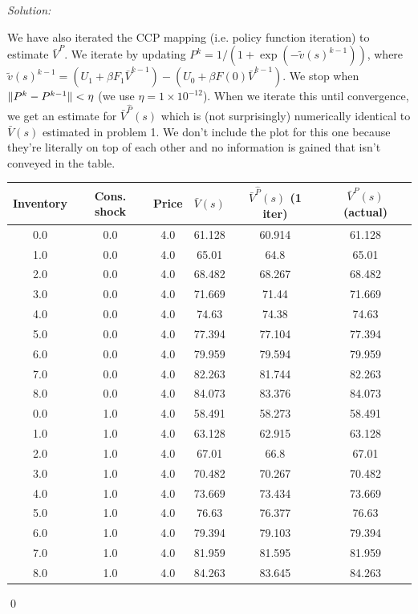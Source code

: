 \documentclass[12pt]{article}
\DeclarePairedDelimiter\norm{\lVert}{\rVert}%
\newenvironment{sol}
    {\emph{Solution:}
    }
    {
    \qed
    }
\begin{document}
\begin{sol}
    We have also iterated the CCP mapping (i.e. policy function iteration) to estimate $\bar{V}^{P}$. We iterate by updating $P^k = 1/(1 + \exp(- \tilde{v}(s)^{k-1}))$, where $\tilde{v}(s)^{k-1} = (U_1 + \beta F_1 \bar{V}^{k-1}) - (U_0 + \beta F(0) \bar{V}^{k-1})$. We stop when $\norm{P^k - P^{k-1}} < \eta$ (we use $\eta = 1 \times 10^{-12}$). When we iterate this until convergence, we get an estimate for $\bar{V}^{\hat{P}}(s)$ which is (not surprisingly) numerically identical to $\bar{V}(s)$ estimated in problem 1. We don't include the plot for this one because they're literally on top of each other and no information is gained that isn't conveyed in the table.
    \begin{table}
        \centering
        \begin{tabular}{|c|c|c|c|c|c|}
            \hline
            Inventory & Cons. shock & Price & $\bar{V}(s)$ & $\bar{V}^{\hat{P}}(s)$ (1 iter)& $\bar{V}^{P}(s)$ (actual) \\
            \hline 
    0.0 & 0.0 & 4.0 & 61.128 & 60.914 & 61.128 \\
    1.0 & 0.0 & 4.0 & 65.01 & 64.8 & 65.01 \\
    2.0 & 0.0 & 4.0 & 68.482 & 68.267 & 68.482 \\
    3.0 & 0.0 & 4.0 & 71.669 & 71.44 & 71.669 \\
    4.0 & 0.0 & 4.0 & 74.63 & 74.38 & 74.63 \\
    5.0 & 0.0 & 4.0 & 77.394 & 77.104 & 77.394 \\
    6.0 & 0.0 & 4.0 & 79.959 & 79.594 & 79.959 \\
    7.0 & 0.0 & 4.0 & 82.263 & 81.744 & 82.263 \\
    8.0 & 0.0 & 4.0 & 84.073 & 83.376 & 84.073 \\
    0.0 & 1.0 & 4.0 & 58.491 & 58.273 & 58.491 \\
    1.0 & 1.0 & 4.0 & 63.128 & 62.915 & 63.128 \\
    2.0 & 1.0 & 4.0 & 67.01 & 66.8 & 67.01 \\
    3.0 & 1.0 & 4.0 & 70.482 & 70.267 & 70.482 \\
    4.0 & 1.0 & 4.0 & 73.669 & 73.434 & 73.669 \\
    5.0 & 1.0 & 4.0 & 76.63 & 76.377 & 76.63 \\
    6.0 & 1.0 & 4.0 & 79.394 & 79.103 & 79.394 \\
    7.0 & 1.0 & 4.0 & 81.959 & 81.595 & 81.959 \\
    8.0 & 1.0 & 4.0 & 84.263 & 83.645 & 84.263 \\

\end{tabular}
\end{table}
\end{sol}
\end{document}
